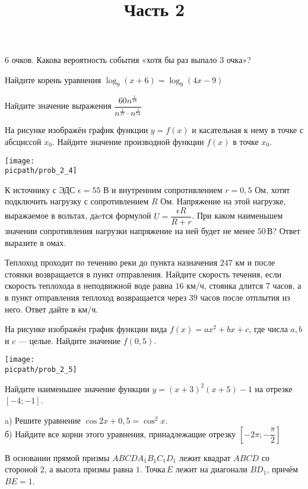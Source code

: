 \begin{training}[1]
\begin{listofex}
		\(6\) очков. Какова вероятность события «хотя бы раз выпало \(3\) очка»?
		\foranswer
		\item Найдите корень уравнения \( \log_9(x+6)=\log_9(4x-9) \)
		\foranswer
		\item Найдите значение выражения \( \dfrac{60n^{\tfrac{1}{18}}}{n^{\tfrac{1}{27}}\cdot n^{\tfrac{1}{54}}} \)
		\foranswer
		\item
		На рисунке изображён график функции \( y=f(x) \) и касательная к нему в точке с абсциссой \( x_0 \). Найдите значение производной функции \( f(x) \) в точке \( x_0 \).
		\begin{center}
			\texttt{[image: \\picpath/prob\_2\_4]}
		\end{center}
		\foranswer
		\item К источнику с ЭДС \( \epsilon=55 \) В и внутренним сопротивлением \( r=0,5 \) Ом, хотят подключить нагрузку с сопротивлением \( R \) Ом. Напряжение на этой нагрузке, выражаемое в вольтах, даeтся формулой \( U=\dfrac{\epsilon R}{R+r} \).  При каком наименьшем значении сопротивления нагрузки напряжение на ней будет не менее \( 50 \) В? Ответ выразите в омах.
		\foranswer
		\item Теплоход проходит по течению реки до пункта назначения \( 247 \) км и после стоянки возвращается в пункт отправления. Найдите скорость течения, если скорость теплохода в неподвижной воде равна \( 16 \) км/ч, стоянка длится \( 7 \) часов, а в пункт отправления теплоход возвращается через \( 39 \) часов после отплытия из него. Ответ дайте в км/ч.
		\foranswer
		\item 
		На рисунке изображён график функции вида \( f(x)=ax^2+bx+c \), где числа \( a \), \( b \) и \( c \) --- целые. Найдите значение \( f(0,5) \).
		\begin{center}
			\texttt{[image: \\picpath/prob\_2\_5]}
		\end{center}
		\foranswer
		\item Найдите наименьшее значение функции \( y=(x+3)^2(x+5)-1 \) на отрезке \( [-4;-1] \).
		\foranswer
		\egepreambtwo
		\title{Часть 2}
		\item a) Решите уравнение \( \cos2x+0,5=\cos^2x \). \\
		б) Найдите все корни этого уравнения, принадлежащие отрезку \( \left[ -2\pi;-\dfrac{\pi}{2} \right]  \)
		\item В основании прямой призмы \( ABCDA_1B_1C_1D_1 \) лежит квадрат \( ABCD \) со стороной \( 2 \), а высота призмы равна \( 1 \). Точка \( E \) лежит на диагонали \( BD_1 \), причём \( BE=1 \).\\

\end{listofex}
\end{training}
